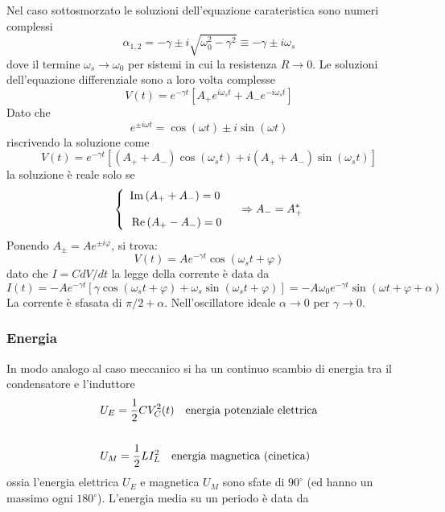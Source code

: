 Nel caso sottosmorzato le soluzioni dell'equazione carateristica sono numeri complessi
\begin{equation*}
	\alpha_{1,2} = - \gamma \pm i \sqrt{\omega_0^2 - \gamma^2} \equiv - \gamma \pm i \omega_{s}
\end{equation*}
dove il termine $\omega_s \to \omega_0$ per sistemi in cui la resistenza $R \to 0$. Le soluzioni dell'equazione differenziale sono a loro volta complesse 
\begin{equation*}
	V(t) = e^{- \gamma t} [A_+ e^{i \omega_s t} + A_-e^{- i\omega_s t}]
\end{equation*}
Dato che 
\begin{equation*}
	e^{\pm i \omega t} = \cos(\omega t) \pm i \sin(\omega t)
\end{equation*}
riscrivendo la soluzione come 
\begin{equation*}
	V(t) = e^{-\gamma t}[(A_++A_-)\cos(\omega_st)+i(A_+ + A_-)\sin(\omega_s t)]
\end{equation*}
la soluzione \`e reale solo se 
\begin{equation*}
\left\{\begin{array}{l}
\operatorname{Im}\left(A_{+}+A_{-}\right)=0 \\ \rule{0pt}{20pt}
\operatorname{Re}\left(A_{+}-A_{-}\right)=0
\end{array} \quad \Rightarrow A_{-}=A_{+}^*\right.
\end{equation*}
Ponendo $A_{\pm} = A e^{\pm i \varphi}$, si trova:
\begin{equation*}
	V(t)= A e^{-\gamma t} \cos \left(\omega_s t+\varphi\right)
\end{equation*}
dato che $I = C  dV/dt$ la legge della corrente \`e data da
\begin{equation*}
	I(t) = -Ae^{- \gamma t} [\gamma \cos (\omega_s t + \varphi) +\omega_s \sin(\omega_s t + \varphi)] = -A \omega_0 e^{- \gamma t} \sin(\omega t + \varphi + \alpha)
\end{equation*}	
La corrente \`e sfasata di $\pi/2 + \alpha$. Nell'oscillatore ideale $\alpha \to 0 $ per $\gamma \to 0$.

\subsubsection{Energia}

In modo analogo al caso meccanico si ha un continuo scambio di energia tra il condensatore e l'induttore
\begin{align*}
& U_E =\frac{1}{2}C V_{C}^2(t) \quad \text{energia potenziale elettrica} \\ \rule{0pt}{30pt}
& U_M = \frac{1}{2}L I_{L}^2 \quad \text{energia magnetica (cinetica)}	
\end{align*} 
ossia l'energia elettrica $U_E$ e magnetica $U_M$ sono sfate di $90^{\circ}$ (ed hanno un massimo ogni $180^{\circ}$). L'energia media su un periodo \`e data da 

